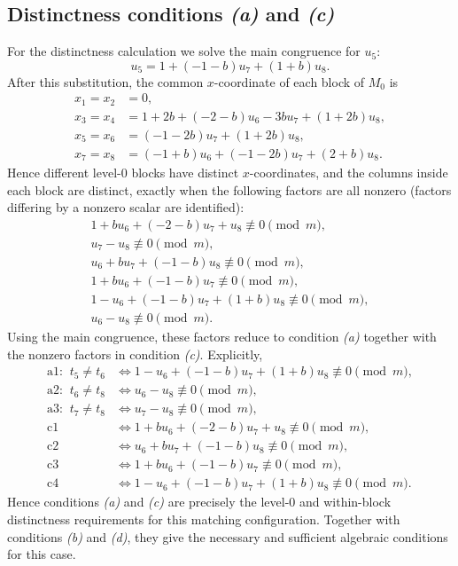 \documentclass[11pt]{article}
\newcommand{\mymod}{\pmod m}
\begin{document}
\subsection{Distinctness conditions \emph{(a)} and \emph{(c)}}
For the distinctness calculation we solve the main congruence for $u_{5}$:
\[
u_{5}=1 + \left(-1 - b\right)u_{7} + \left(1 + b\right)u_{8}.
\]
After this substitution, the common $x$-coordinate of each block of $M_0$ is
\[
\begin{aligned}
x_{1}=x_{2}&=0,\\
x_{3}=x_{4}&=1 + 2b + \left(-2 - b\right)u_{6} - 3bu_{7} + \left(1 + 2b\right)u_{8},\\
x_{5}=x_{6}&=\left(-1 - 2b\right)u_{7} + \left(1 + 2b\right)u_{8},\\
x_{7}=x_{8}&=\left(-1 + b\right)u_{6} + \left(-1 - 2b\right)u_{7} + \left(2 + b\right)u_{8}.
\end{aligned}
\]
Hence different level-$0$ blocks have distinct $x$-coordinates, and the columns inside each block are distinct, exactly when the following factors are all nonzero (factors differing by a nonzero scalar are identified):
\[
\begin{gathered}
1 + bu_{6} + \left(-2 - b\right)u_{7} + u_{8}\not\equiv 0\mymod,\\
u_{7} - u_{8}\not\equiv 0\mymod,\\
u_{6} + bu_{7} + \left(-1 - b\right)u_{8}\not\equiv 0\mymod,\\
1 + bu_{6} + \left(-1 - b\right)u_{7}\not\equiv 0\mymod,\\
1 - u_{6} + \left(-1 - b\right)u_{7} + \left(1 + b\right)u_{8}\not\equiv 0\mymod,\\
u_{6} - u_{8}\not\equiv 0\mymod.
\end{gathered}
\]
Using the main congruence, these factors reduce to condition \emph{(a)} together with the nonzero factors in condition \emph{(c)}.  Explicitly,
\[
\begin{aligned}
\text{a1: }\ t_5 \neq t_6&\Longleftrightarrow 1 - u_{6} + \left(-1 - b\right)u_{7} + \left(1 + b\right)u_{8}\not\equiv0\mymod,\\
\text{a2: }\ t_6 \neq t_8&\Longleftrightarrow u_{6} - u_{8}\not\equiv0\mymod,\\
\text{a3: }\ t_7 \neq t_8&\Longleftrightarrow u_{7} - u_{8}\not\equiv0\mymod,\\
\text{c1}&\Longleftrightarrow 1 + bu_{6} + \left(-2 - b\right)u_{7} + u_{8}\not\equiv0\mymod,\\
\text{c2}&\Longleftrightarrow u_{6} + bu_{7} + \left(-1 - b\right)u_{8}\not\equiv0\mymod,\\
\text{c3}&\Longleftrightarrow 1 + bu_{6} + \left(-1 - b\right)u_{7}\not\equiv0\mymod,\\
\text{c4}&\Longleftrightarrow 1 - u_{6} + \left(-1 - b\right)u_{7} + \left(1 + b\right)u_{8}\not\equiv0\mymod.
\end{aligned}
\]
Hence conditions \emph{(a)} and \emph{(c)} are precisely the level-$0$ and within-block distinctness requirements for this matching configuration.  Together with conditions \emph{(b)} and \emph{(d)}, they give the necessary and sufficient algebraic conditions for this case.
\end{document}
